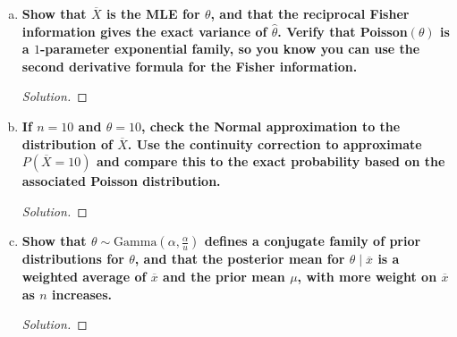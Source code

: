 \documentclass[11pt]{article}
\newenvironment{solution}
  {\renewcommand\qedsymbol{$\blacksquare$}\begin{proof}[Solution]}
  {\end{proof}}
\begin{document}
\begin{enumerate}
\begin{enumerate}[a)]
        \item \textbf{Show that $\overline{X}$ is the MLE for $\theta$, and that the reciprocal Fisher information gives the exact variance of $\hat{\theta}$. 
        Verify that Poisson$(\theta)$ is a $1$-parameter exponential family, so you know you can use the second derivative formula for the Fisher information.}

        \begin{solution}
            
        \end{solution}
        
        \item \textbf{If $n = 10$ and $\theta = 10$, check the Normal approximation to the distribution of $\overline{X}$. Use the continuity
        correction to approximate $P(\overline{X} = 10)$ and compare this to the exact probability based on the associated Poisson distribution.}

        \begin{solution}
            
        \end{solution}
        
        \item \textbf{Show that $\theta \sim \mathrm{Gamma}\left( \alpha, \frac{\alpha}{u} \right)$ defines a conjugate family of prior distributions for $\theta$, and that the
        posterior mean for $\theta \mid \overline{x}$ is a weighted average of $\overline{x}$ and the prior mean $\mu$, with more weight on $\overline{x}$ as $n$ increases.}

        \begin{solution}
            
        \end{solution}
    \end{enumerate}
    
\end{enumerate}
\end{document}

